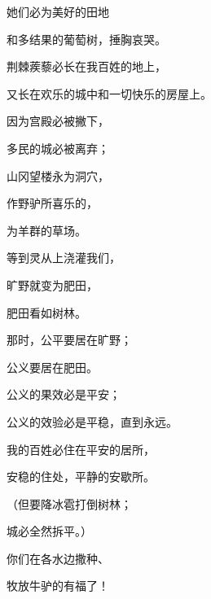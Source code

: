 {\par }{\Q {}她们必为美好的田地
\par }{\Q 和多结果的葡萄树，捶胸哀哭。
\par }{\Q {}荆棘蒺藜必长在我百姓的地上，
\par }{\Q 又长在欢乐的城中和一切快乐的房屋上。
\par }{\Q {}因为宫殿必被撇下，
\par }{\Q 多民的城必被离弃；
\par }{\Q 山冈望楼永为洞穴，
\par }{\Q 作野驴所喜乐的，
\par }{\Q 为羊群的草场。
\par }{\Q {}等到{}灵从上浇灌我们，
\par }{\Q 旷野就变为肥田，
\par }{\Q 肥田看如树林。
\par }{\Q {}那时，公平要居在旷野；
\par }{\Q 公义要居在肥田。
\par }{\Q {}公义的果效必是平安；
\par }{\Q 公义的效验必是平稳，直到永远。
\par }{\Q {}我的百姓必住在平安的居所，
\par }{\Q 安稳的住处，平静的安歇所。
\par }{\Q {}（但要降冰雹打倒树林；
\par }{\Q 城必全然拆平。）
\par }{\Q {}你们在各水边撒种、
\par }{\Q 牧放牛驴的有福了！

}
